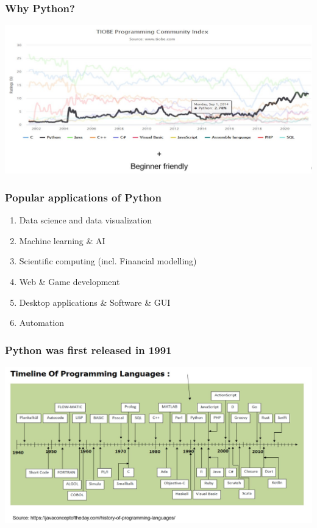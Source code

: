 \documentclass{beamer}
\begin{document}
\begin{frame}
    \frametitle{Why Python?}
    \centering
    \includegraphics[scale = 0.5]{figures/trend_python.jpg}
\end{frame}

\begin{frame}
    \frametitle{Popular applications of Python}
    \begin{enumerate}
        \item Data science and data visualization
        \item Machine learning \& AI
        \item Scientific computing (incl. Financial modelling)
        \item Web \& Game development
        \item Desktop applications \& Software \& GUI
        \item Automation
    \end{enumerate}
\end{frame}

\begin{frame}
    \frametitle{Python was first released in 1991}
    \centering
    \includegraphics[scale = 0.4]{figures/timeline_lang.jpg}
\end{frame}
\end{document}
